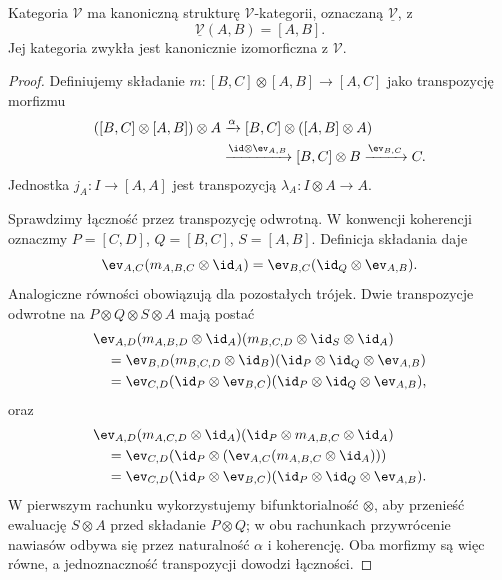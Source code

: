 \begin{twierdzenie}[Samowzbogacenie]\label{cat:thm:self-enrichment}
Kategoria $\mathcal V$ ma kanoniczną strukturę $\mathcal V$-kategorii, oznaczaną $\underline{\mathcal V}$, z
\[
 \underline{\mathcal V}(A,B)=[A,B].
\]
Jej kategoria zwykła jest kanonicznie izomorficzna z $\mathcal V$.
\end{twierdzenie}
\begin{proof}
Definiujemy składanie $m:[B,C]\otimes[A,B]\to[A,C]$ jako transpozycję morfizmu
\[
 \begin{aligned}
 ([B,C]\otimes[A,B])\otimes A
 &\xrightarrow{\alpha}[B,C]\otimes([A,B]\otimes A)\\
 &\xrightarrow{\id\otimes\ev_{A,B}}[B,C]\otimes B
 \xrightarrow{\ev_{B,C}}C.
 \end{aligned}
\]
Jednostka $j_A:I\to[A,A]$ jest transpozycją $\lambda_A:I\otimes A\to A$.

Sprawdzimy łączność przez transpozycję odwrotną. W konwencji koherencji oznaczmy $P=[C,D]$, $Q=[B,C]$, $S=[A,B]$. Definicja składania daje
\[
 \ev_{A,C}(m_{A,B,C}\otimes\id_A)
 =\ev_{B,C}(\id_Q\otimes\ev_{A,B}).
\]
Analogiczne równości obowiązują dla pozostałych trójek. Dwie transpozycje odwrotne na $P\otimes Q\otimes S\otimes A$ mają postać
\[
\begin{aligned}
 &\ev_{A,D}(m_{A,B,D}\otimes\id_A)
 (m_{B,C,D}\otimes\id_S\otimes\id_A)\\
 &\quad=\ev_{B,D}(m_{B,C,D}\otimes\id_B)
 (\id_P\otimes\id_Q\otimes\ev_{A,B})\\
 &\quad=\ev_{C,D}(\id_P\otimes\ev_{B,C})
 (\id_P\otimes\id_Q\otimes\ev_{A,B}),
\end{aligned}
\]
oraz
\[
\begin{aligned}
 &\ev_{A,D}(m_{A,C,D}\otimes\id_A)
 (\id_P\otimes m_{A,B,C}\otimes\id_A)\\
 &\quad=\ev_{C,D}
 (\id_P\otimes(\ev_{A,C}(m_{A,B,C}\otimes\id_A)))\\
 &\quad=\ev_{C,D}(\id_P\otimes\ev_{B,C})
 (\id_P\otimes\id_Q\otimes\ev_{A,B}).
\end{aligned}
\]
W pierwszym rachunku wykorzystujemy bifunktorialność $\otimes$, aby przenieść ewaluację $S\otimes A$ przed składanie $P\otimes Q$; w obu rachunkach przywrócenie nawiasów odbywa się przez naturalność $\alpha$ i koherencję. Oba morfizmy są więc równe, a jednoznaczność transpozycji dowodzi łączności.


\end{proof}
